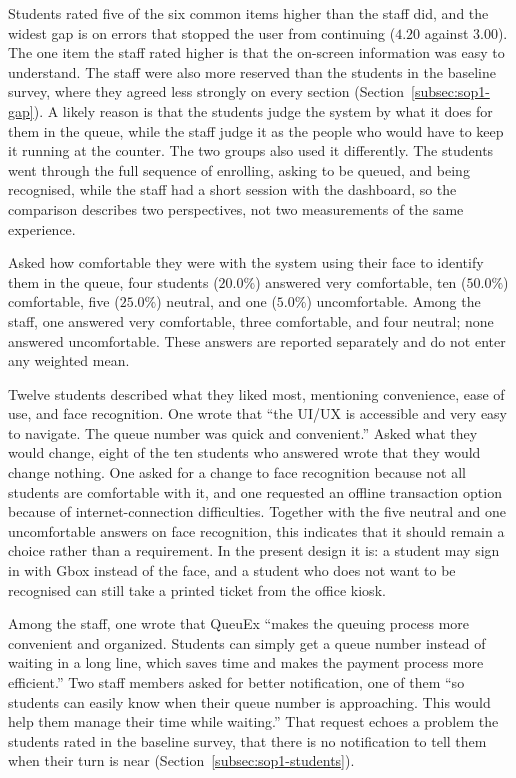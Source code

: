 \documentclass{research}
\newcommand{\sysname}{QueuEx}
\begin{document}
\noindent Students rated five of the six common items higher than the
staff did, and the widest gap is on errors that stopped the user from
continuing ($4.20$ against $3.00$). The one item the staff rated higher
is that the on-screen information was easy to understand. The staff were
also more reserved than the students in the baseline survey, where they
agreed less strongly on every section (Section~\ref{subsec:sop1-gap}). A
likely reason is that the students judge the system by what it does for
them in the queue, while the staff judge it as the people who would have
to keep it running at the counter. The two groups also used it
differently. The
students went through the full sequence of enrolling, asking to be
queued, and being recognised, while the staff had a short session with
the dashboard, so the comparison describes two perspectives, not two
measurements of the same experience.

\label{subsec:sop4-supplementary}

Asked how comfortable they were with the system using their face to
identify them in the queue, four students ($20.0\%$) answered very
comfortable, ten ($50.0\%$) comfortable, five ($25.0\%$) neutral, and
one ($5.0\%$) uncomfortable. Among the staff, one answered very
comfortable, three comfortable, and four neutral; none answered
uncomfortable.
These answers are reported separately and do not enter any weighted
mean.

Twelve students described what they liked most, mentioning convenience,
ease of use, and face recognition. One wrote that ``the UI/UX is
accessible and very easy to navigate. The queue number was quick and
convenient.'' Asked what they would change, eight of the ten students
who answered wrote that they would change nothing. One asked for a
change to face recognition because not all students are comfortable
with it, and one requested an offline transaction option because of
internet-connection difficulties. Together with the five neutral and
one uncomfortable answers on face recognition, this indicates that
it should remain a choice rather than a requirement. In
the present design it is: a student may sign in with Gbox instead of the
face, and a student who does not want to be recognised can still take a
printed ticket from the office kiosk.

Among the staff, one wrote that \sysname{} ``makes the queuing process
more convenient and organized. Students can simply get a queue number
instead of waiting in a long line, which saves time and makes the
payment process more efficient.'' Two staff members asked for better
notification, one of them ``so students can easily know when their queue
number is approaching. This would help them manage their time while
waiting.'' That request echoes a problem the students rated in the
baseline survey, that there is no notification to tell them when their
turn is near (Section~\ref{subsec:sop1-students}).
\end{document}
